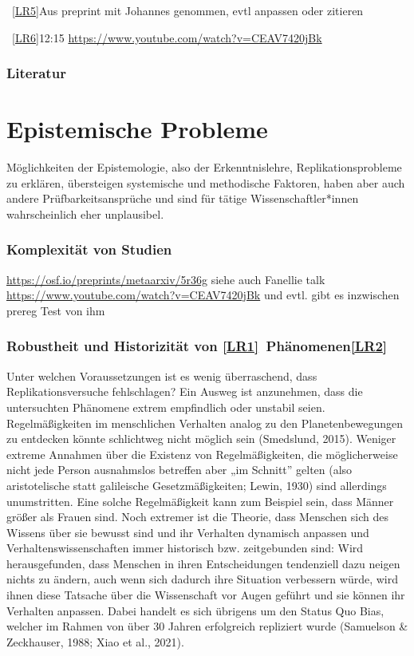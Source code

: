 \documentclass[
  letterpaper,
  DIV=11,
  numbers=noendperiod]{scrreprt}
\begin{document}
~\hyperref[_msoanchor_5]{{[}LR5{]}}Aus preprint mit Johannes genommen,
evtl anpassen oder zitieren

~\hyperref[_msoanchor_6]{{[}LR6{]}}12:15
\url{https://www.youtube.com/watch?v=CEAV7420jBk}

\subsection{Literatur}\label{literatur-9}

\chapter{Epistemische Probleme}\label{epistemische-probleme}

Möglichkeiten der Epistemologie, also der Erkenntnislehre,
Replikationsprobleme zu erklären, übersteigen systemische und
methodische Faktoren, haben aber auch andere Prüfbarkeitsansprüche und
sind für tätige Wissenschaftler*innen wahrscheinlich eher unplausibel.

\subsection{Komplexität von Studien}\label{komplexituxe4t-von-studien}

\url{https://osf.io/preprints/metaarxiv/5r36g} siehe auch Fanellie talk
\url{https://www.youtube.com/watch?v=CEAV7420jBk} und evtl. gibt es
inzwischen prereg Test von ihm

\subsection{\texorpdfstring{Robustheit und Historizität von
\hyperref[_msocom_1]{{[}LR1{]}}~Phänomenen\hyperref[_msocom_2]{{[}LR2{]}}~}{Robustheit und Historizität von {[}LR1{]}~Phänomenen{[}LR2{]}~}}\label{robustheit-und-historizituxe4t-von-lr1-phuxe4nomenenlr2}

Unter welchen Voraussetzungen ist es wenig überraschend, dass
Replikationsversuche fehlschlagen? Ein Ausweg ist anzunehmen, dass die
untersuchten Phänomene extrem empfindlich oder unstabil seien.
Regelmäßigkeiten im menschlichen Verhalten analog zu den
Planetenbewegungen zu entdecken könnte schlichtweg nicht möglich sein
(Smedslund, 2015). Weniger extreme Annahmen über die Existenz von
Regelmäßigkeiten, die möglicherweise nicht jede Person ausnahmslos
betreffen aber „im Schnitt'' gelten (also aristotelische statt
galileische Gesetzmäßigkeiten; Lewin, 1930) sind allerdings
unumstritten. Eine solche Regelmäßigkeit kann zum Beispiel sein, dass
Männer größer als Frauen sind. Noch extremer ist die Theorie, dass
Menschen sich des Wissens über sie bewusst sind und ihr Verhalten
dynamisch anpassen und Verhaltenswissenschaften immer historisch bzw.
zeitgebunden sind: Wird herausgefunden, dass Menschen in ihren
Entscheidungen tendenziell dazu neigen nichts zu ändern, auch wenn sich
dadurch ihre Situation verbessern würde, wird ihnen diese Tatsache über
die Wissenschaft vor Augen geführt und sie können ihr Verhalten
anpassen. Dabei handelt es sich übrigens um den Status Quo Bias, welcher
im Rahmen von über 30 Jahren erfolgreich repliziert wurde (Samuelson \&
Zeckhauser, 1988; Xiao et al., 2021).
\end{document}
